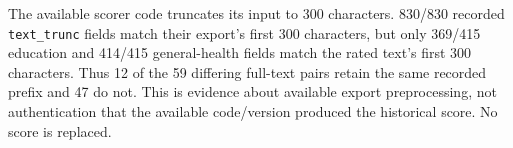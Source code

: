 The available scorer code truncates its input to 300 characters. 830/830 recorded \texttt{text\_trunc} fields match their export's first 300 characters, but only 369/415 education and 414/415 general-health fields match the rated text's first 300 characters. Thus 12 of the 59 differing full-text pairs retain the same recorded prefix and 47 do not. This is evidence about available export preprocessing, not authentication that the available code/version produced the historical score. No score is replaced.
